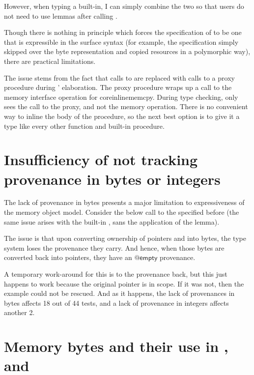 However, when typing a built-in, I can simply combine the two so that users do
not need to use lemmas after calling .

Though there is nothing in principle which forces the specification of
 to be one that is expressible in the surface syntax (for
example, the specification simply skipped over the byte representation and
copied resources in a polymorphic way), there are practical limitations.

The issue stems from the fact that calls to  are
replaced with calls to a proxy  procedure during '
elaboration. The proxy procedure wraps up a call to the memory interface
operation for coreinline{memcpy}. During type checking,  only
sees the call to the proxy, and not the memory operation. There is no
convenient way to inline the body of the procedure, so the next best
option is to give it a type like every other function and built-in
procedure.

\section{Insufficiency of not tracking provenance in bytes or integers}

The lack of provenance in bytes presents a major limitation to expressiveness
of the memory object model. Consider the below call to the
 specified before (the same issue arises with the built-in
, sans the application of the 
lemma).


The issue is that upon converting ownership of pointers  and
 into bytes, the type system loses the provenance they carry. And
hence, when those bytes are converted back into pointers, they have an
$@\mathsf{empty}$ provenance.

A temporary work-around for this is to  the
provenance back, but this just happens to work because the original pointer is
in scope. If it was not, then the example could not be rescued. And as it
happens, the lack of provenances in bytes affects 18 out of 44 tests, and a
lack of provenance in integers affects another 2.


\section{Memory bytes and their use in , 
and }\label{sec:mem-bytes-use}

